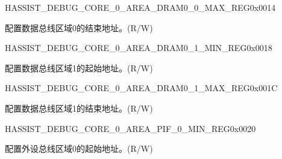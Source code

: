 \begin{register}{H}{ASSIST\_DEBUG\_CORE\_0\_AREA\_DRAM0\_0\_MAX\_REG}{0x0014}\label{regdesc:ASSISTDEBUGCORE0AREADRAM00MAXREG}
%
\regnewline%
\begin{regdesc}\begin{reglist}
\label{fielddesc:ASSISTDEBUGCORE0AREADRAM00MAX}\item [ASSIST\_DEBUG\_CORE\_0\_AREA\_DRAM0\_0\_MAX] 配置数据总线区域0的结束地址。(R/W)
\end{reglist}\end{regdesc}
\end{register}


\begin{register}{H}{ASSIST\_DEBUG\_CORE\_0\_AREA\_DRAM0\_1\_MIN\_REG}{0x0018}\label{regdesc:ASSISTDEBUGCORE0AREADRAM01MINREG}
%
\regnewline%
\begin{regdesc}\begin{reglist}
\label{fielddesc:ASSISTDEBUGCORE0AREADRAM01MIN}\item [ASSIST\_DEBUG\_CORE\_0\_AREA\_DRAM0\_1\_MIN] 配置数据总线区域1的起始地址。(R/W)
\end{reglist}\end{regdesc}
\end{register}


\begin{register}{H}{ASSIST\_DEBUG\_CORE\_0\_AREA\_DRAM0\_1\_MAX\_REG}{0x001C}\label{regdesc:ASSISTDEBUGCORE0AREADRAM01MAXREG}
%
\regnewline%
\begin{regdesc}\begin{reglist}
\label{fielddesc:ASSISTDEBUGCORE0AREADRAM01MAX}\item [ASSIST\_DEBUG\_CORE\_0\_AREA\_DRAM0\_1\_MAX] 配置数据总线区域1的结束地址。(R/W)
\end{reglist}\end{regdesc}
\end{register}


\begin{register}{H}{ASSIST\_DEBUG\_CORE\_0\_AREA\_PIF\_0\_MIN\_REG}{0x0020}\label{regdesc:ASSISTDEBUGCORE0AREAPIF0MINREG}
%
\regnewline%
\begin{regdesc}\begin{reglist}
\label{fielddesc:ASSISTDEBUGCORE0AREAPIF0MIN}\item [ASSIST\_DEBUG\_CORE\_0\_AREA\_PIF\_0\_MIN] 配置外设总线区域0的起始地址。(R/W)
\end{reglist}\end{regdesc}
\end{register}


